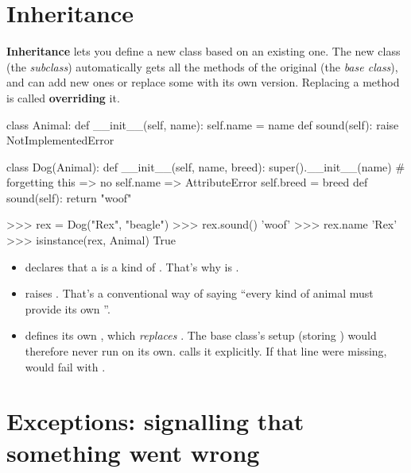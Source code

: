 \documentclass[10pt,a4paper]{article}
\begin{document}
\section{Inheritance}
\textbf{Inheritance} lets you define a new class based on an existing one. The new class (the \emph{subclass}) automatically gets all the methods of the original (the \emph{base class}), and can add new ones or replace some with its own version. Replacing a method is called \textbf{overriding} it.
\begin{pycode}
class Animal:
    def __init__(self, name):
        self.name = name
    def sound(self):
        raise NotImplementedError

class Dog(Animal):
    def __init__(self, name, breed):
        super().__init__(name)        # forgetting this => no self.name => AttributeError
        self.breed = breed
    def sound(self):
        return "woof"
\end{pycode}
\begin{txtcode}
>>> rex = Dog("Rex", "beagle")
>>> rex.sound()
'woof'
>>> rex.name
'Rex'
>>> isinstance(rex, Animal)
True
\end{txtcode}
\begin{itemize}
\item {} declares that a  is a kind of . That’s why  is .
\item {} raises . That’s a conventional way of saying “every kind of animal must provide its own ”.
\item {} defines its own , which \emph{replaces} . The base class’s setup (storing ) would therefore never run on its own.  calls it explicitly. If that line were missing,  would fail with .
\end{itemize}
\setcounter{section}{6}
\section{Exceptions: signalling that something went wrong}
\end{document}
